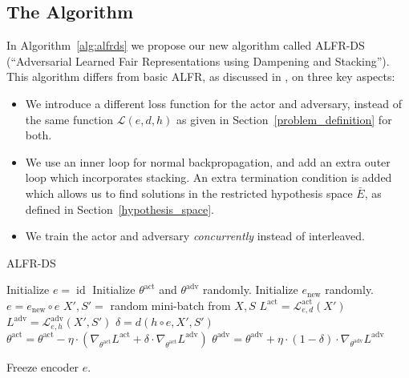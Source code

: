 \documentclass[nohyperref]{article}
\theoremstyle{plain}
\theoremstyle{definition}
\theoremstyle{remark}
\begin{document}
\subsection{The Algorithm}
In Algorithm~\ref{alg:alfrds} we propose our new algorithm called ALFR-DS (``Adversarial Learned Fair Representations using Dampening and Stacking''). This algorithm differs from basic ALFR, as discussed in \cite{edwards2016censoring}, on three key aspects:
\begin{itemize}
    \item We introduce a different loss function for the actor and adversary, instead of the same function $\mathcal{L}(e,d,h)$ as given in Section~\ref{problem_definition} for both.
    \item We use an inner loop for normal backpropagation, and add an extra outer loop which incorporates stacking. An extra termination condition is added which allows us to find solutions in the restricted hypothesis space $\bar{E}$, as defined in Section~\ref{hypothesis_space}.
    \item We train the actor and adversary \emph{concurrently} instead of interleaved. 
\end{itemize}
\begin{algorithm}[tb]
   \caption{ALFR-DS}
   \label{alg:alfrds}
\begin{algorithmic}
   \STATE Initialize $e = \mathop{id}$ 
   \STATE Initialize $\theta^{\mathop{act}}$ and $\theta^{\mathop{adv}}$ randomly.
   \REPEAT
   \STATE Initialize $e_{\mathop{new}}$ randomly.
   \STATE $e = e_{\mathop{new}} \circ e$ 
   \REPEAT
   \STATE $X', S' = $ random mini-batch from $X, S$
   \STATE $L^{\mathop{act}} = \mathcal{L}^{\mathop{act}}_{e,d}(X')$
   \STATE $L^{\mathop{adv}} = \mathcal{L}^{\mathop{adv}}_{e,h}(X', S')$
   \STATE $\delta = d(h \circ e, X',S')$
   \STATE $\theta^{\mathop{act}} = \theta^{\mathop{act}} - \eta \cdot \left( \nabla_{\theta^{\mathop{act}}}  L^{\mathop{act}} +  \delta \cdot \nabla_{\theta^{\mathop{act}}} L^{\mathop{adv}} \right)$
   \STATE $\theta^{\mathop{adv}} = \theta^{\mathop{adv}} + \eta \cdot  (1-\delta) \cdot \nabla_{\theta^{\mathop{adv}}} L^{\mathop{adv}}$

   \STATE Freeze encoder $e$.
\end{algorithmic}
\end{algorithm}
\end{document}
